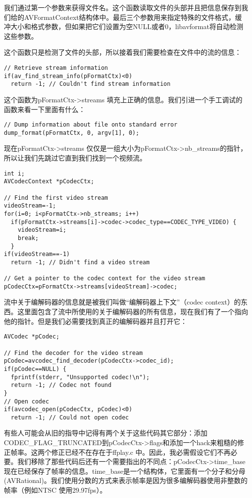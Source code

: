 我们通过第一个参数来获得文件名。这个函数读取文件的头部并且把信息保存到我们给的AVFormatContext结构体中。最后三个参数用来指定特殊的文件格式，缓冲大小和格式参数，但如果把它们设置为空NULL或者0，libavformat将自动检测这些参数。

这个函数只是检测了文件的头部，所以接着我们需要检查在文件中的流的信息：
\begin{lstlisting}
// Retrieve stream information
if(av_find_stream_info(pFormatCtx)<0)
  return -1; // Couldn't find stream information
\end{lstlisting}

这个函数为pFormatCtx->streams 填充上正确的信息。我们引进一个手工调试的
函数来看一下里面有什么：
\begin{lstlisting}
// Dump information about file onto standard error
dump_format(pFormatCtx, 0, argv[1], 0);
\end{lstlisting}

现在pFormatCtx->streams 仅仅是一组大小为pFormatCtx->nb_streams的指针，所以让我们先跳过它直到我们找到一个视频流。
\begin{lstlisting}
int i;
AVCodecContext *pCodecCtx;

// Find the first video stream
videoStream=-1;
for(i=0; i<pFormatCtx->nb_streams; i++)
  if(pFormatCtx->streams[i]->codec->codec_type==CODEC_TYPE_VIDEO) {
    videoStream=i;
    break;
  }
if(videoStream==-1)
  return -1; // Didn't find a video stream

// Get a pointer to the codec context for the video stream
pCodecCtx=pFormatCtx->streams[videoStream]->codec;
\end{lstlisting}

流中关于编解码器的信息就是被我们叫做“编解码器上下文”（codec context）的东西。这里面包含了流中所使用的关于编解码器的所有信息，现在我们有了一个指向他的指针。但是我们必需要找到真正的编解码器并且打开它：
\begin{lstlisting}
AVCodec *pCodec;

// Find the decoder for the video stream
pCodec=avcodec_find_decoder(pCodecCtx->codec_id);
if(pCodec==NULL) {
  fprintf(stderr, "Unsupported codec!\n");
  return -1; // Codec not found
}
// Open codec
if(avcodec_open(pCodecCtx, pCodec)<0)
  return -1; // Could not open codec
\end{lstlisting}

有些人可能会从旧的指导中记得有两个关于这些代码其它部分：添加CODEC_FLAG_TRUNCATED到pCodecCtx->flags和添加一个hack来粗糙的修正帧率。这两个修正已经不在存在于ffplay.c 中。因此，我必需假设它们不再必要。我们移除了那些代码后还有一个需要指出的不同点：pCodecCtx->time_base 现在已经保存了帧率的信息。time_base是一个结构体，它里面有一个分子和分母(AVRational)。我们使用分数的方式来表示帧率是因为很多编解码器使用非整数的帧率（例如NTSC 使用29.97fps）。

